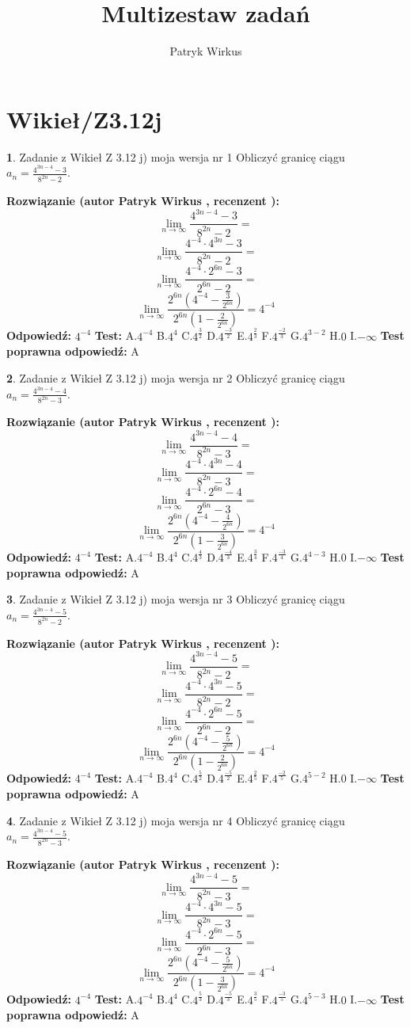 \documentclass[12pt, a4paper]{article}
\title{Multizestaw zadań}
\author{Patryk Wirkus}
\date{}
\theoremstyle{definition} %
\newtheorem{zad}{}
\newcommand{\kategoria}[1]{\section{#1}}
\newcommand{\zadStart}[1]{\begin{zad}#1\newline}
\newcommand{\zadStop}{\end{zad}}
\newcommand{\rozwStart}[2]{\noindent \textbf{Rozwiązanie (autor #1 , recenzent #2): }\newline}
\newcommand{\rozwStop}{\newline}
\newcommand{\odpStart}{\noindent \textbf{Odpowiedź:}\newline}
\newcommand{\odpStop}{\newline}
\newcommand{\testStart}{\noindent \textbf{Test:}\newline}
\newcommand{\testStop}{\newline}
\newcommand{\kluczStart}{\noindent \textbf{Test poprawna odpowiedź:}\newline}
\newcommand{\kluczStop}{\newline}
\begin{document}
\maketitle

\kategoria{Wikieł/Z3.12j}


\zadStart{Zadanie z Wikieł Z 3.12 j) moja wersja nr 1}
Obliczyć granicę ciągu $a_{n}=\frac{4^{3n-4}-3}{8^{2n}-2}$.
\zadStop
\rozwStart{Patryk Wirkus}{}
$$\lim\limits_{n\to\infty}\frac{4^{3n-4}-3}{8^{2n}-2}=$$
$$\lim\limits_{n\to\infty}\frac{4^{-4} \cdot 4^{3n}-3}{8^{2n}-2}=$$
$$\lim\limits_{n\to\infty}\frac{4^{-4} \cdot 2^{6n}-3}{2^{6n}-2}=$$
$$\lim\limits_{n\to\infty}\frac{2^{6n}(4^{-4} - \frac{3}{2^{6n}})}{2^{6n}(1-\frac{2}{2^{6n}})}= 4^{-4}$$
\rozwStop
\odpStart
$4^{-4}$
\odpStop
\testStart
A.$4^{-4}$
B.$4^{4}$
C.$4^{\frac{3}{2}}$
D.$4^{\frac{-3}{2}}$
E.$4^{\frac{2}{3}}$
F.$4^{\frac{-2}{3}}$
G.$4^{3-2}$
H.$0$
I.$-\infty$
\testStop
\kluczStart
A
\kluczStop



\zadStart{Zadanie z Wikieł Z 3.12 j) moja wersja nr 2}
Obliczyć granicę ciągu $a_{n}=\frac{4^{3n-4}-4}{8^{2n}-3}$.
\zadStop
\rozwStart{Patryk Wirkus}{}
$$\lim\limits_{n\to\infty}\frac{4^{3n-4}-4}{8^{2n}-3}=$$
$$\lim\limits_{n\to\infty}\frac{4^{-4} \cdot 4^{3n}-4}{8^{2n}-3}=$$
$$\lim\limits_{n\to\infty}\frac{4^{-4} \cdot 2^{6n}-4}{2^{6n}-3}=$$
$$\lim\limits_{n\to\infty}\frac{2^{6n}(4^{-4} - \frac{4}{2^{6n}})}{2^{6n}(1-\frac{3}{2^{6n}})}= 4^{-4}$$
\rozwStop
\odpStart
$4^{-4}$
\odpStop
\testStart
A.$4^{-4}$
B.$4^{4}$
C.$4^{\frac{4}{3}}$
D.$4^{\frac{-4}{3}}$
E.$4^{\frac{3}{4}}$
F.$4^{\frac{-3}{4}}$
G.$4^{4-3}$
H.$0$
I.$-\infty$
\testStop
\kluczStart
A
\kluczStop



\zadStart{Zadanie z Wikieł Z 3.12 j) moja wersja nr 3}
Obliczyć granicę ciągu $a_{n}=\frac{4^{3n-4}-5}{8^{2n}-2}$.
\zadStop
\rozwStart{Patryk Wirkus}{}
$$\lim\limits_{n\to\infty}\frac{4^{3n-4}-5}{8^{2n}-2}=$$
$$\lim\limits_{n\to\infty}\frac{4^{-4} \cdot 4^{3n}-5}{8^{2n}-2}=$$
$$\lim\limits_{n\to\infty}\frac{4^{-4} \cdot 2^{6n}-5}{2^{6n}-2}=$$
$$\lim\limits_{n\to\infty}\frac{2^{6n}(4^{-4} - \frac{5}{2^{6n}})}{2^{6n}(1-\frac{2}{2^{6n}})}= 4^{-4}$$
\rozwStop
\odpStart
$4^{-4}$
\odpStop
\testStart
A.$4^{-4}$
B.$4^{4}$
C.$4^{\frac{5}{2}}$
D.$4^{\frac{-5}{2}}$
E.$4^{\frac{2}{5}}$
F.$4^{\frac{-2}{5}}$
G.$4^{5-2}$
H.$0$
I.$-\infty$
\testStop
\kluczStart
A
\kluczStop



\zadStart{Zadanie z Wikieł Z 3.12 j) moja wersja nr 4}
Obliczyć granicę ciągu $a_{n}=\frac{4^{3n-4}-5}{8^{2n}-3}$.
\zadStop
\rozwStart{Patryk Wirkus}{}
$$\lim\limits_{n\to\infty}\frac{4^{3n-4}-5}{8^{2n}-3}=$$
$$\lim\limits_{n\to\infty}\frac{4^{-4} \cdot 4^{3n}-5}{8^{2n}-3}=$$
$$\lim\limits_{n\to\infty}\frac{4^{-4} \cdot 2^{6n}-5}{2^{6n}-3}=$$
$$\lim\limits_{n\to\infty}\frac{2^{6n}(4^{-4} - \frac{5}{2^{6n}})}{2^{6n}(1-\frac{3}{2^{6n}})}= 4^{-4}$$
\rozwStop
\odpStart
$4^{-4}$
\odpStop
\testStart
A.$4^{-4}$
B.$4^{4}$
C.$4^{\frac{5}{3}}$
D.$4^{\frac{-5}{3}}$
E.$4^{\frac{3}{5}}$
F.$4^{\frac{-3}{5}}$
G.$4^{5-3}$
H.$0$
I.$-\infty$
\testStop
\kluczStart
A
\kluczStop
\end{document}
